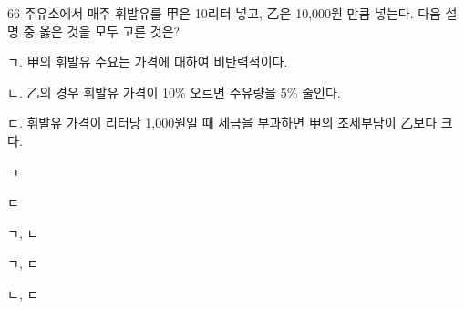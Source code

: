 \begin{question}{66}
주유소에서 매주 휘발유를 甲은 10리터 넣고, 乙은 10,000원 만큼 넣는다. 다음 설명 중 옳은 것을 모두 고른 것은?
\begin{framedtext}
ㄱ. 甲의 휘발유 수요는 가격에 대하여 비탄력적이다. \par
ㄴ. 乙의 경우 휘발유 가격이 10\% 오르면 주유량을 5\% 줄인다. \par
ㄷ. 휘발유 가격이 리터당 1,000원일 때 세금을 부과하면 甲의 조세부담이 乙보다 크다. \par
\end{framedtext}
\begin{choices}
  \item ㄱ
  \item ㄷ
  \item ㄱ, ㄴ
  \item ㄱ, ㄷ
  \item ㄴ, ㄷ
\end{choices}
\end{question}
